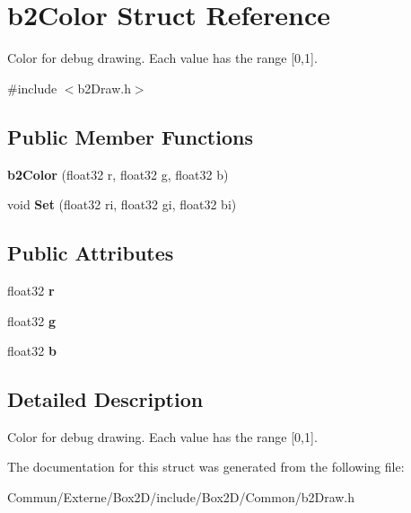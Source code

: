 \hypertarget{structb2_color}{}\section{b2\+Color Struct Reference}
\label{structb2_color}


Color for debug drawing. Each value has the range \mbox{[}0,1\mbox{]}.  




{\ttfamily \#include $<$b2\+Draw.\+h$>$}

\subsection*{Public Member Functions}
\begin{DoxyCompactItemize}
\item 
{\bfseries b2\+Color} (float32 r, float32 g, float32 b)\hypertarget{structb2_color_abddfc60d402d691542a224921868bfb7}{}\label{structb2_color_abddfc60d402d691542a224921868bfb7}

\item 
void {\bfseries Set} (float32 ri, float32 gi, float32 bi)\hypertarget{structb2_color_af35a718911e10a54fa8aaa86367a5b56}{}\label{structb2_color_af35a718911e10a54fa8aaa86367a5b56}

\end{DoxyCompactItemize}
\subsection*{Public Attributes}
\begin{DoxyCompactItemize}
\item 
float32 {\bfseries r}\hypertarget{structb2_color_a9ab6c9a910caee177d96980b74ffb00b}{}\label{structb2_color_a9ab6c9a910caee177d96980b74ffb00b}

\item 
float32 {\bfseries g}\hypertarget{structb2_color_a241c742352403ec456b51ac5f2abe7d9}{}\label{structb2_color_a241c742352403ec456b51ac5f2abe7d9}

\item 
float32 {\bfseries b}\hypertarget{structb2_color_a9e7380d27a63010cfad49b97f66dcd26}{}\label{structb2_color_a9e7380d27a63010cfad49b97f66dcd26}

\end{DoxyCompactItemize}


\subsection{Detailed Description}
Color for debug drawing. Each value has the range \mbox{[}0,1\mbox{]}. 

The documentation for this struct was generated from the following file\+:\begin{DoxyCompactItemize}
\item 
Commun/\+Externe/\+Box2\+D/include/\+Box2\+D/\+Common/b2\+Draw.\+h\end{DoxyCompactItemize}
